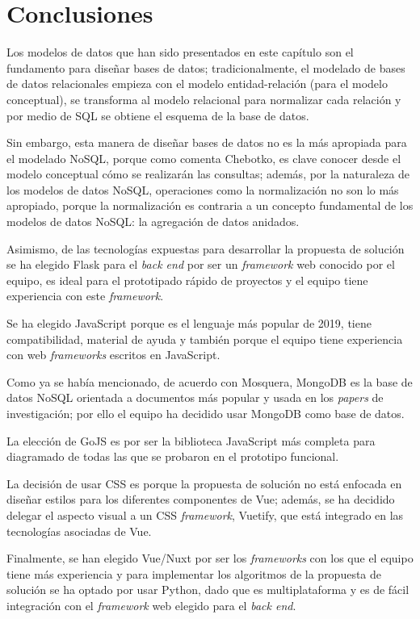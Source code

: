 \section{Conclusiones}\label{ref:conclusiones-cap3}


Los modelos de datos que han sido presentados en este capítulo son el fundamento para diseñar bases de datos; tradicionalmente, el modelado de bases de datos relacionales empieza con el modelo entidad-relación (para el modelo conceptual), se transforma al modelo relacional para normalizar cada relación y por medio de SQL se obtiene el esquema de la base de datos. 


Sin embargo, esta manera de diseñar bases de datos no es la más apropiada para el modelado NoSQL, porque como comenta Chebotko\cite{chebotko_big_2015}, es clave conocer desde el modelo conceptual cómo se realizarán las consultas; además, por la naturaleza de los modelos de datos NoSQL, operaciones como la normalización no son lo más apropiado, porque la normalización es contraria a un concepto fundamental de los modelos de datos NoSQL: la agregación de datos anidados.

Asimismo, de las tecnologías expuestas para desarrollar la propuesta de solución se ha elegido Flask para el \textit{back end} por ser un \textit{framework} web conocido por el equipo, es ideal para el prototipado rápido de proyectos y el equipo tiene experiencia con este \textit{framework}.


Se ha elegido JavaScript porque es el lenguaje más popular de 2019, tiene compatibilidad, material de ayuda y también porque el equipo tiene experiencia con web \textit{frameworks} escritos en JavaScript.


Como ya se había mencionado, de acuerdo con Mosquera\cite{martinez-mosquera_modeling_2020}, MongoDB es la base de datos NoSQL orientada a documentos más popular y usada en los \textit{papers} de investigación; por ello el equipo ha decidido usar MongoDB como base de datos.


La elección de GoJS es por ser la biblioteca JavaScript más completa para diagramado de todas las que se probaron en el prototipo funcional.



La decisión de usar CSS es porque la propuesta de solución no está enfocada en diseñar estilos para los diferentes componentes de Vue; además, se ha decidido delegar el aspecto visual a un CSS \textit{framework}, Vuetify, que está integrado en las tecnologías asociadas de Vue.


Finalmente, se han elegido Vue/Nuxt por ser los \textit{frameworks} con los que el equipo tiene más experiencia y para implementar los algoritmos de la propuesta de solución se ha optado por usar Python, dado que es multiplataforma y es de fácil integración con el \textit{framework} web elegido para el \textit{back end}.
